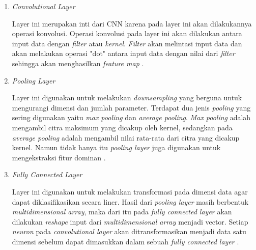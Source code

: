 \begin{enumerate}
  \item \textit{Convolutional Layer} \par
  Layer ini merupakan inti dari CNN karena pada layer ini akan dilakukannya operasi konvolusi. Operasi konvolusi pada layer ini akan dilakukan antara input data dengan \textit{filter} atau \textit{kernel}. \textit{Filter} akan melintasi input data dan akan melakukan operasi "dot" antara input data dengan nilai dari \textit{filter} sehingga akan menghasilkan \textit{feature map} \parencite{LinaQ}.
  
  \item \textit{Pooling Layer} \par
  Layer ini digunakan untuk melakukan \textit{downsampling} yang berguna untuk mengurangi dimensi dan jumlah parameter. Terdapat dua jenis \textit{pooling} yang sering digunakan yaitu \textit{max pooling} dan  \textit{average pooling}. \textit{Max pooling} adalah mengambil citra maksimum yang dicakup oleh kernel, sedangkan pada \textit{average pooling} adalah mengambil nilai rata-rata dari citra yang dicakup kernel.
  Namun tidak hanya itu \textit{pooling layer} juga digunakan untuk mengekstraksi fitur dominan \parencite{Bukusakti}. 

  \item \textit{Fully Connected Layer} \par
  Layer ini digunakan untuk melakukan transformasi pada dimensi data agar dapat diklasifikasikan secara liner.
  Hasil dari \textit{pooling layer} masih berbentuk \textit{multidimensional array}, maka dari itu pada \textit{fully connected layer} akan dilakukan \textit{reshape} input dari \textit{multidimensional array} menjadi vector. Setiap \textit{neuron} pada \textit{convolutional layer} akan ditransformasikan menjadi data satu dimensi sebelum dapat dimasukkan dalam sebuah \textit{fully connected layer} \parencite{JurnalTeknikITS}.
\end{enumerate} 

